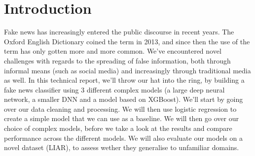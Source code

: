 \section*{Introduction}
Fake news has increasingly entered the public discourse in recent years. The Oxford English Dictionary coined the term
in 2013, and since then the use of the term has only gotten more and more common. We've encountered
novel challenges with regards to the spreading of false information, both through informal means (such as social media)
and increasingly through traditional media as well. In this technical report, we'll throw our hat
into the ring, by building a fake news classifier using 3 different complex models (a large deep neural network, a
smaller DNN and a model based on XGBoost). We'll start by going over our
data cleaning and processing. We will then use logistic regression to create a simple model that we can use as a
baseline. We will then go over our choice of complex models, before we take a look at the results and compare
performance across the different models. We will also evaluate our models on a novel dataset (LIAR), to assess wether
they generalise to unfamiliar domains.
